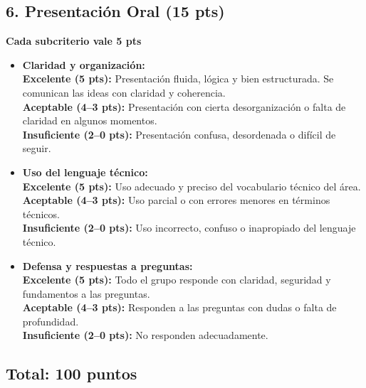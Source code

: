 \documentclass{article}
\begin{document}
\subsection*{6. Presentación Oral (15 pts)}
\textbf{Cada subcriterio vale 5 pts}

\begin{itemize}

  \item \textbf{Claridad y organización:} \\
  \textbf{Excelente (5 pts):} Presentación fluida, lógica y bien estructurada. Se comunican las ideas con claridad y coherencia. \\
  \textbf{Aceptable (4--3 pts):} Presentación con cierta desorganización o falta de claridad en algunos momentos. \\
  \textbf{Insuficiente (2--0 pts):} Presentación confusa, desordenada o difícil de seguir.

  \item \textbf{Uso del lenguaje técnico:} \\
  \textbf{Excelente (5 pts):} Uso adecuado y preciso del vocabulario técnico del área. \\
  \textbf{Aceptable (4--3 pts):} Uso parcial o con errores menores en términos técnicos. \\
  \textbf{Insuficiente (2--0 pts):} Uso incorrecto, confuso o inapropiado del lenguaje técnico.

  \item \textbf{Defensa y respuestas a preguntas:} \\
  \textbf{Excelente (5 pts):} Todo el grupo responde con claridad, seguridad y fundamentos a las preguntas. \\
  \textbf{Aceptable (4--3 pts):} Responden a las preguntas con dudas o falta de profundidad. \\
  \textbf{Insuficiente (2--0 pts):} No responden adecuadamente. 

\end{itemize}


\subsection*{Total: 100 puntos}
\end{document}
